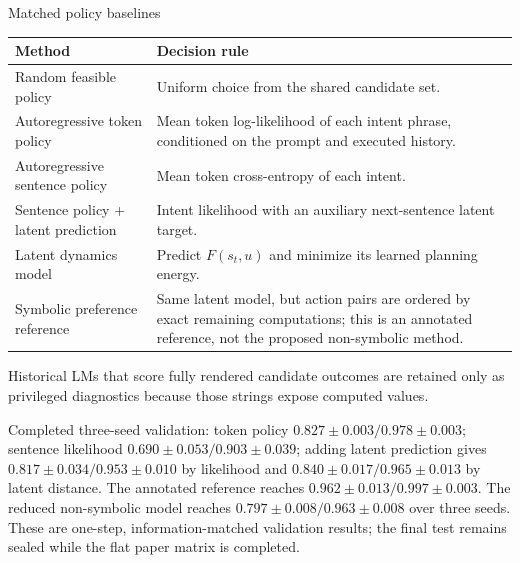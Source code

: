 \documentclass[aspectratio=169,10pt]{beamer}
\begin{document}
\begin{frame}{Matched policy baselines}
\small
\begin{tabular}{p{}p{}}
\toprule
Method & Decision rule\\
\midrule
Random feasible policy & Uniform choice from the shared candidate set.\\
Autoregressive token policy & Mean token log-likelihood of each intent phrase,
conditioned on the prompt and executed history.\\
Autoregressive sentence policy & Mean token cross-entropy of each intent.\\
Sentence policy + latent prediction & Intent likelihood with an auxiliary
next-sentence latent target.\\
Latent dynamics model & Predict $F(s_t,u)$ and minimize its learned planning
energy.\\
Symbolic preference reference & Same latent model, but action pairs are
ordered by exact remaining computations; this is an annotated reference, not
the proposed non-symbolic method.\\
\bottomrule
\end{tabular}

\medskip
Historical LMs that score fully rendered candidate outcomes are retained only
as privileged diagnostics because those strings expose computed values.

\medskip
Completed three-seed validation: token policy
$0.827\pm0.003/0.978\pm0.003$; sentence likelihood
$0.690\pm0.053/0.903\pm0.039$; adding latent prediction gives
$0.817\pm0.034/0.953\pm0.010$ by likelihood and
$\mathbf{0.840\pm0.017}/0.965\pm0.013$ by latent distance. The annotated
reference reaches $0.962\pm0.013/0.997\pm0.003$. The reduced non-symbolic
model reaches $0.797\pm0.008/0.963\pm0.008$ over three seeds. These are
one-step, information-matched validation results; the final test remains
sealed while the flat paper matrix is completed.
\end{frame}
\end{document}
